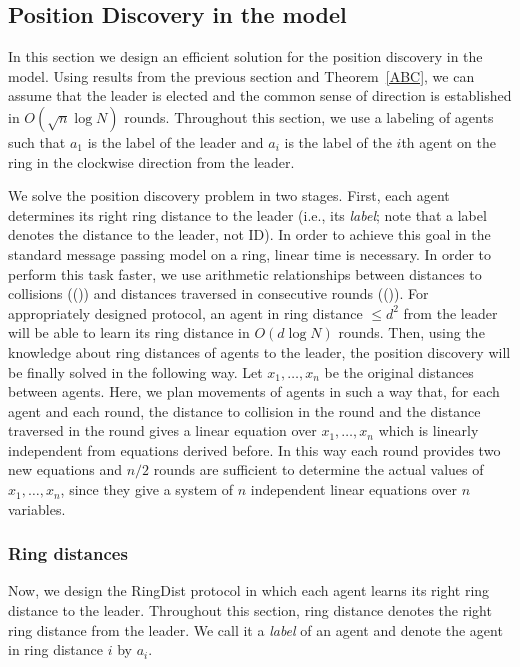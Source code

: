 \subsection{Position Discovery in the {\perceptive} model}

In this section we design an efficient solution for the position
discovery in the {\perceptive} model. Using results from the previous
section and Theorem~\ref{ABC},
we can assume that the leader is elected and the common sense of direction is established
in $O(\sqrt{n}\log N)$ rounds.
Throughout this section, we use a labeling of agents such that $a_1$ is the label of the leader and $a_i$ is the
label of the $i$th agent on the ring in the clockwise direction from the leader.


We solve the position discovery problem in two stages. First, each agent determines
its right ring distance to the leader (i.e., its {\em label}; note that a label denotes
the distance to the leader, not ID).  
In order to achieve this goal in the standard message passing model on a ring, linear
time is necessary. In order to perform this task faster, we use arithmetic relationships
between distances to collisions (\coll()) and  distances traversed in consecutive rounds (\pos()).
For appropriately designed protocol, an agent in ring distance $\leq d^2$ from the leader will
be able to learn its ring distance in $O(d\log N)$ rounds.
Then, using the knowledge about ring distances of agents to the leader, the position discovery
will be finally solved in the following way. Let $x_1,\ldots,x_n$ be the original distances between agents.
Here, we plan movements of agents in such a way that, for each agent and each round,
the distance to collision in the round and the distance traversed in the round gives a linear equation
over $x_1,\dots,x_n$ which is linearly independent from equations
derived before. In this way each round provides two new equations and $n/2$ rounds are sufficient
to determine the actual values of $x_1,\dots,x_n$,
since they give a system of $n$ independent linear equations over
$n$ variables.




\subsubsection{Ring distances}
Now, we design the RingDist protocol in which each agent learns
its right ring distance to the leader. Throughout this section, ring distance denotes the right ring distance from
the leader. We call it a {\em label} of an agent and denote the agent in ring
distance $i$ by $a_i$.


